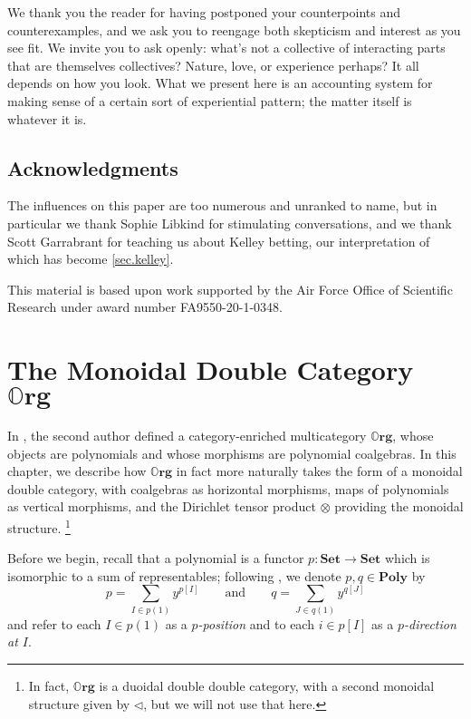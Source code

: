 \documentclass[11pt, one side, article]{memoir}
\theoremstyle{definition}
\theoremstyle{plain}
\newcommand{\Cat}[1]{\mathbf{#1}}%
\newcommand{\smset}{\Cat{Set}}
\newcommand{\poly}{\Cat{Poly}}
\newcommand{\0}{\textsf{0}}
\newcommand{\1}{\tn{\textsf{1}}}
\newcommand{\tri}{\mathbin{\triangleleft}}
\newcommand{\qqand}{\qquad\text{and}\qquad}
\newcommand{\org}{{\mathbb{O}\Cat{rg}}}
\begin{document}
We thank you the reader for having postponed your counterpoints and counterexamples, and we ask you to reengage both skepticism and interest as you see fit. We invite you to ask openly: what's not a collective of interacting parts that are themselves collectives? Nature, love, or experience perhaps? It all depends on how you look. What we present here is an accounting system for making sense of a certain sort of experiential pattern; the matter itself is whatever it is.

\section{Acknowledgments}

The influences on this paper are too numerous and unranked to name, but in particular we thank Sophie Libkind for stimulating conversations, and we thank Scott Garrabrant for teaching us about Kelley betting, our interpretation of which has become \cref{sec.kelley}.

This material is based upon work supported by the Air Force Office of Scientific Research under award number FA9550-20-1-0348.


\chapter{The Monoidal Double Category $\org$}\label{chap.org}

In \cite{spivak2021learners}, the second author defined a category-enriched multicategory $\org$, whose objects are polynomials and whose morphisms are polynomial coalgebras. In this chapter, we describe how $\org$ in fact more naturally takes the form of a monoidal double category, with coalgebras as horizontal morphisms, maps of polynomials as vertical morphisms, and the Dirichlet tensor product $\otimes$ providing the monoidal structure.%
\footnote{In fact, $\org$ is a duoidal double double category, with a second monoidal structure given by $\tri$, but we will not use that here.}

Before we begin, recall that a polynomial is a functor $p\colon \smset\to\smset$ which is isomorphic to a sum of representables; following \cite{spivak2021learners}, we denote $p,q\in\poly$ by
\begin{equation}\label{eqn.poly_notation}
p = \sum_{I \in p(1)} y^{p[I]} \qqand q = \sum_{J \in q(1)} y^{q[J]}
\end{equation}
and refer to each $I\in p(1)$ as a \emph{$p$-position} and to each $i\in p[I]$ as a \emph{$p$-direction at $I$}.
\end{document}
